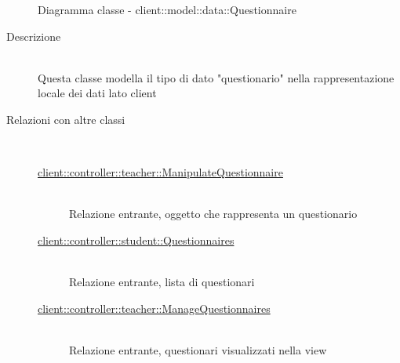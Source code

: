 \begin{figure}[H]
	\centering
	\caption{Diagramma classe - client::model::data::Questionnaire}
\end{figure}\begin{description}
\item[Descrizione] \hfill \\
Questa classe modella il tipo di dato "questionario" nella rappresentazione locale dei dati lato client
\item[Relazioni con altre classi] \hfill \\
\vspace{-7mm}
\begin{description}
	\item[\hyperlink{client::controller::teacher::ManipulateQuestionnaire}{client::controller::teacher::ManipulateQuestionnaire}] \hfill \\
	Relazione entrante, oggetto che rappresenta un questionario
	\item[\hyperlink{client::controller::student::Questionnaires}{client::controller::student::Questionnaires}] \hfill \\
	Relazione entrante, lista di questionari
	\item[\hyperlink{client::controller::teacher::ManageQuestionnaires}{client::controller::teacher::ManageQuestionnaires}] \hfill \\
	Relazione entrante, questionari visualizzati nella view
\end{description}


\end{description}
